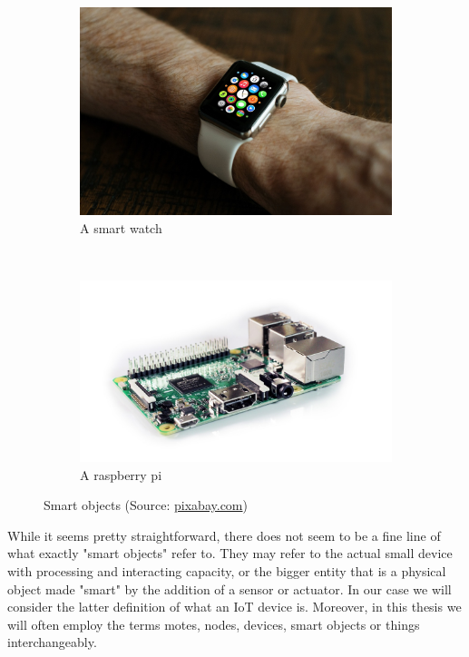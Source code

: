 \begin{figure}
    \centering
    \begin{subfigure}[b]{0.3\textwidth}
        \includegraphics[width=\textwidth]{res/smart_watch}
        \caption{A smart watch}
        \label{fig:smart_watch}
    \end{subfigure}
    ~
    \begin{subfigure}[b]{0.3\textwidth}
        \includegraphics[width=\textwidth]{res/raspberry_pi}
        \caption{A raspberry pi}
        \label{fig:raspberry}
    \end{subfigure}
    \caption{Smart objects (Source: \url{pixabay.com})}\label{fig:smart_objects}
\end{figure}

While it seems pretty straightforward, there does not seem to be a fine line of what exactly "smart objects" refer to. They may refer to the actual small device with processing and interacting capacity, or the bigger entity that is a physical object made "smart" by the addition of a sensor or actuator. In our case we will consider the latter definition of what an IoT device is.
Moreover, in this thesis we will often employ the terms motes, nodes, devices, smart objects or things interchangeably. \\

